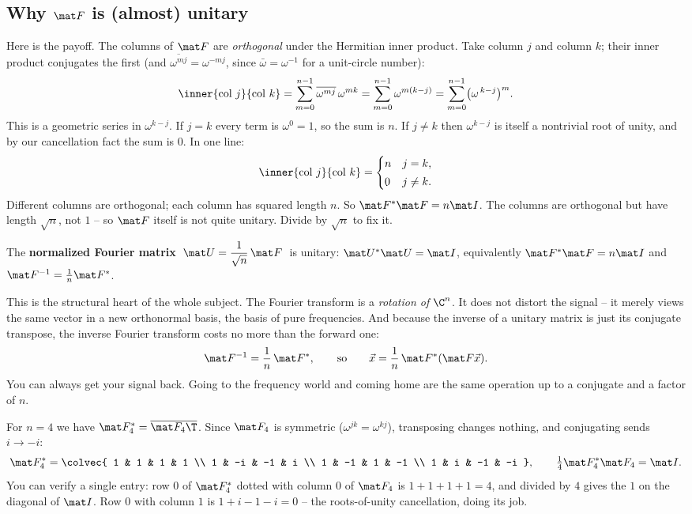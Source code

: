 \subsection{Why $\mat F$ is (almost) unitary}

Here is the payoff. The columns of $\mat F$ are \emph{orthogonal} under the
Hermitian inner product. Take column $j$ and column $k$; their inner product
conjugates the first (and $\overline{\omega^{mj}} = \omega^{-mj}$, since
$\bar\omega = \omega^{-1}$ for a unit-circle number):
\[
  \inner{\text{col }j}{\text{col }k}
  = \sum_{m=0}^{n-1}\overline{\omega^{mj}}\,\omega^{mk}
  = \sum_{m=0}^{n-1}\omega^{m(k-j)}
  = \sum_{m=0}^{n-1}\bigl(\omega^{\,k-j}\bigr)^{m}.
\]
This is a geometric series in $\omega^{k-j}$. If $j=k$ every term is
$\omega^0 = 1$, so the sum is $n$. If $j\ne k$ then $\omega^{k-j}$ is itself a
nontrivial root of unity, and by our cancellation fact the sum is $0$. In one line:
\[
  \inner{\text{col }j}{\text{col }k} = \begin{cases} n & j=k,\\[2pt] 0 & j\ne k.
  \end{cases}
\]
Different columns are orthogonal; each column has squared length $n$. So
$\mat F^{*}\mat F = n\mat I$. The columns are orthogonal but have length $\sqrt n$,
not $1$ -- so $\mat F$ itself is not quite unitary. Divide by $\sqrt n$ to fix it.

\begin{theorem}\label{ch32:fourierunitary}
The \textbf{normalized Fourier matrix} $\;\mat U = \dfrac{1}{\sqrt n}\,\mat F\;$ is
unitary: $\mat U^{*}\mat U = \mat I$, equivalently $\mat F^{*}\mat F = n\mat I$ and
$\mat F^{-1} = \tfrac1n\mat F^{*}$.
\end{theorem}

This is the structural heart of the whole subject. The Fourier transform is a
\emph{rotation of $\C^n$}. It does not distort the signal -- it merely views the
same vector in a new orthonormal basis, the basis of pure frequencies. And because
the inverse of a unitary matrix is just its conjugate transpose, the inverse
Fourier transform costs no more than the forward one:
\[
  \mat F^{-1} = \frac1n\,\mat F^{*}, \qquad\text{so}\qquad
  \vec x = \frac1n\,\mat F^{*}(\mat F\vec x).
\]
You can always get your signal back. Going to the frequency world and coming home
are the same operation up to a conjugate and a factor of $n$.

\begin{example}\label{ch32:invex}
For $n=4$ we have $\mat F_4^{*}=\overline{\mat F_4\T}$. Since $\mat F_4$ is
symmetric ($\omega^{jk}=\omega^{kj}$), transposing changes nothing, and
conjugating sends $i\to-i$:
\[
  \mat F_4^{*} = \colvec{
    1 & 1 & 1 & 1 \\
    1 & -i & -1 & i \\
    1 & -1 & 1 & -1 \\
    1 & i & -1 & -i }, \qquad
  \tfrac14\mat F_4^{*}\mat F_4 = \mat I.
\]
You can verify a single entry: row $0$ of $\mat F_4^{*}$ dotted with column $0$ of
$\mat F_4$ is $1+1+1+1=4$, and divided by $4$ gives the $1$ on the diagonal of
$\mat I$. Row $0$ with column $1$ is $1+i-1-i=0$ -- the roots-of-unity
cancellation, doing its job.
\end{example}

